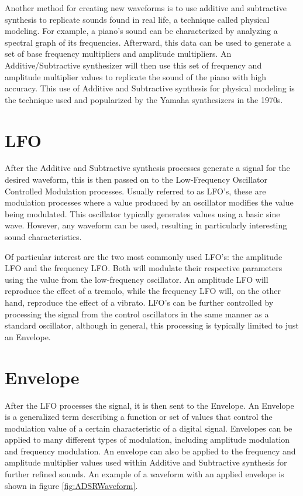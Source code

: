 \documentclass[a4paper,12pt]{report}
\begin{document}
Another method for creating new waveforms is to use additive and subtractive synthesis to replicate sounds found in real life, a technique called physical modeling. For example, a piano's sound can be characterized by analyzing a spectral graph of its frequencies. Afterward, this data can be used to generate a set of base frequency multipliers and amplitude multipliers. An Additive/Subtractive synthesizer will then use this set of frequency and amplitude multiplier values to replicate the sound of the piano with high accuracy. This use of Additive and Subtractive synthesis for physical modeling is the technique used and popularized by the Yamaha synthesizers in the 1970s.

\section{LFO}
\label{sec:lfo}
After the Additive and Subtractive synthesis processes generate a signal for the desired waveform, this is then passed on to the Low-Frequency Oscillator Controlled Modulation processes. Usually referred to as LFO's, these are modulation processes where a value produced by an oscillator modifies the value being modulated. This oscillator typically generates values using a basic sine wave. However, any waveform can be used, resulting in particularly interesting sound characteristics.

Of particular interest are the two most commonly used LFO's: the amplitude LFO and the frequency LFO. Both will modulate their respective parameters using the value from the low-frequency oscillator. An amplitude LFO will reproduce the effect of a tremolo, while the frequency LFO will, on the other hand, reproduce the effect of a vibrato. LFO's can be further controlled by processing the signal from the control oscillators in the same manner as a standard oscillator, although in general, this processing is typically limited to just an Envelope.

\section{Envelope}
\label{sec:env}
After the LFO processes the signal, it is then sent to the Envelope. An Envelope is a generalized term describing a function or set of values that control the modulation value of a certain characteristic of a digital signal. Envelopes can be applied to many different types of modulation, including amplitude modulation and frequency modulation. An envelope can also be applied to the frequency and amplitude multiplier values used within Additive and Subtractive synthesis for further refined sounds. An example of a waveform with an applied envelope is shown in figure \ref{fig:ADSRWaveform}.
\end{document}
